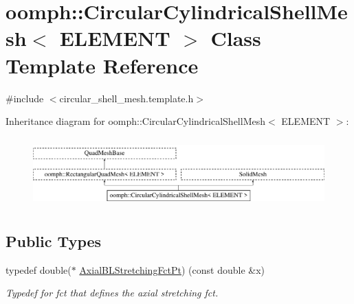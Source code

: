\hypertarget{classoomph_1_1CircularCylindricalShellMesh}{}\section{oomph\+:\+:Circular\+Cylindrical\+Shell\+Mesh$<$ E\+L\+E\+M\+E\+NT $>$ Class Template Reference}
\label{classoomph_1_1CircularCylindricalShellMesh}


{\ttfamily \#include $<$circular\+\_\+shell\+\_\+mesh.\+template.\+h$>$}

Inheritance diagram for oomph\+:\+:Circular\+Cylindrical\+Shell\+Mesh$<$ E\+L\+E\+M\+E\+NT $>$\+:\begin{figure}[H]
\begin{center}
\leavevmode
\includegraphics[height=2.700965cm]{classoomph_1_1CircularCylindricalShellMesh}
\end{center}
\end{figure}
\subsection*{Public Types}
\begin{DoxyCompactItemize}
\item 
typedef double($\ast$ \hyperlink{classoomph_1_1CircularCylindricalShellMesh_a770336fa72e8911f31b9fe3f70197a51}{Axial\+B\+L\+Stretching\+Fct\+Pt}) (const double \&x)
\begin{DoxyCompactList}\small\item\em Typedef for fct that defines the axial stretching fct. \end{DoxyCompactList}\end{DoxyCompactItemize}
